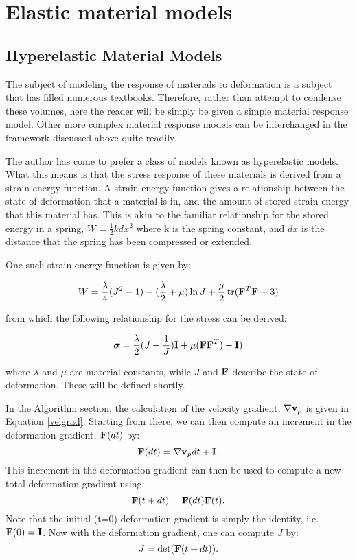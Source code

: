 \chapter{Elastic material models}
\section{Hyperelastic Material Models}

The subject of modeling the response of materials to deformation 
is a subject that has filled numerous textbooks.  Therefore, 
rather than attempt to condense these volumes, here the reader 
will be simply be given a simple material response model.  Other 
more complex material response models can be interchanged in the 
framework discussed above quite readily.

The author has come to prefer a class of models known as 
hyperelastic models.  What this means is that the stress 
response of these materials is derived from a strain energy 
function.  A strain energy function gives a relationship between 
the state of deformation that a material is in, and the amount 
of stored strain energy that this material has.  This is akin to 
the familiar relationship for the stored energy in a spring, 
$W=\frac{1}{2} k dx^2$ where k is the spring constant, and $dx$ is
the distance that the spring has been compressed or extended.

One such strain energy function is given by:

\begin{equation}
	W = \frac{\lambda}{4}(J^2-1)
 - (\frac{\lambda}{2}+\mu) \ln J
+ \frac{\mu}{2}\,\text{tr}(\mbox{\ensuremath{\mathbf{F}}}^T\mbox{\ensuremath{\mathbf{F}}} - 3)
\end{equation}

from which the following relationship for the stress can be 
derived:

\begin{equation}
       \mbox{\boldmath $\sigma \!\!$ \unboldmath} = \frac{\lambda}{2}(J-\frac{1}{J})\mbox{\ensuremath{\mathbf{I}}} 
  + \mu (\mbox{\ensuremath{\mathbf{F}}}\mbox{\ensuremath{\mathbf{F}}}^T) - \mbox{\ensuremath{\mathbf{I}}})
 \label{stress}
\end{equation}

where $\lambda$ and $\mu$ are material constants, while $J$ and 
$\mbox{\ensuremath{\mathbf{F}}}$ describe the state of deformation.  These will be 
defined shortly.

In the Algorithm section, the calculation of the velocity 
gradient, $\nabla \mbox{\ensuremath{\mathbf{v}}}_p$ is given in Equation \ref{velgrad}.
Starting from there, we can then compute an increment in the 
deformation gradient, $\mbox{\ensuremath{\mathbf{F}}}(dt)$ by:
\begin{equation}
	\mbox{\ensuremath{\mathbf{F}}}(dt) = \nabla \mbox{\ensuremath{\mathbf{v}}}_p dt + \mbox{\ensuremath{\mathbf{I}}}.
\end{equation}
This increment in the deformation gradient can then be used to 
compute a new total deformation gradient using:
\begin{equation}
	\mbox{\ensuremath{\mathbf{F}}}(t+dt) = \mbox{\ensuremath{\mathbf{F}}}(dt) \mbox{\ensuremath{\mathbf{F}}}(t).
\end{equation}
Note that the initial (t=0) deformation gradient is simply the 
identity, i.e. $\mbox{\ensuremath{\mathbf{F}}}(0) = \mbox{\ensuremath{\mathbf{I}}}$.  Now with the deformation 
gradient, one can compute $J$ by:
\begin{equation}
	J = \det(\mbox{\ensuremath{\mathbf{F}}}(t+dt)).
\end{equation}

